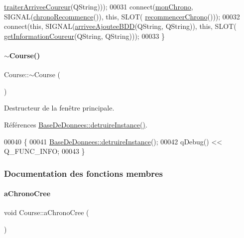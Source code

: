 \begin{DoxyCode}
      \hyperlink{class_course_a60073d16efd4ccefa81bddb4aaa88fab}{traiterArriveeCoureur}(QString)));
00031     connect(\hyperlink{class_course_a0c9b246b0f1ec612bd6e6c613a94d52b}{monChrono}, SIGNAL(\hyperlink{class_course_a178f2015d20ef5d838564671567f6831}{chronoRecommence}()), \textcolor{keyword}{this}, SLOT(
      \hyperlink{class_course_addeae907c4bc0a268f51479041de389c}{recommencerChrono}()));
00032     connect(\textcolor{keyword}{this}, SIGNAL(\hyperlink{class_course_aa2f0312e68f57e1437c3257d13af8186}{arriveeAjouteeBDD}(QString, QString)), \textcolor{keyword}{this}, SLOT(
      \hyperlink{class_course_a7ba5d2c9865065e95f49a24fbeec7857}{getInformationCoureur}(QString, QString)));
00033 \}
\end{DoxyCode}
\mbox{\label{class_course_aa9038f2e129526920037dda9e76d69d0}} 
\paragraph{\texorpdfstring{$\sim$\+Course()}{~Course()}}
{\footnotesize\ttfamily Course\+::$\sim$\+Course (\begin{DoxyParamCaption}{ }\end{DoxyParamCaption})}



Destructeur de la fenêtre principale. 



Références \hyperlink{class_base_de_donnees_a457401c0816b888c77ce915997545f4e}{Base\+De\+Donnees\+::detruire\+Instance()}.


\begin{DoxyCode}
00040 \{
00041     \hyperlink{class_base_de_donnees_a457401c0816b888c77ce915997545f4e}{BaseDeDonnees::detruireInstance}();
00042     qDebug() << Q\_FUNC\_INFO;
00043 \}
\end{DoxyCode}


\subsubsection{Documentation des fonctions membres}
\mbox{\label{class_course_ada484058a0180a31a98ee77c4fad93f8}} 
\paragraph{\texorpdfstring{a\+Chrono\+Cree}{aChronoCree}}
{\footnotesize\ttfamily void Course\+::a\+Chrono\+Cree (\begin{DoxyParamCaption}{ }\end{DoxyParamCaption})\hspace{0.3cm}{\ttfamily [slot]}}



